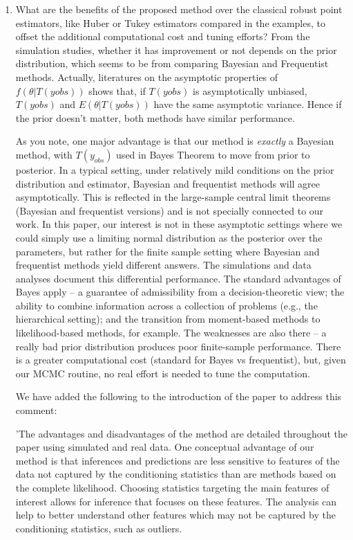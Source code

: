 \documentclass{article}
\newcommand{\response}[1]{{\color{blue}#1}}
\begin{document}
\begin{enumerate}
\item What are the benefits of the proposed method over the classical robust point estimators, like Huber or Tukey estimators compared in the examples, to offset the additional computational cost and tuning efforts? From the simulation studies, whether it has improvement or not depends on the prior distribution, which seems to be from comparing Bayesian and Frequentist methods. Actually, literatures on the asymptotic properties of $f(\theta|T(yobs))$ shows that, if $T(yobs)$ is asymptotically unbiased, $T (yobs)$ and $E(\theta | T (yobs))$ have the same asymptotic variance. Hence if the prior doesn't matter, both methods have similar performance.

\response{As you note, one major advantage is that our method is {\em exactly} a Bayesian method, with $T(y_{obs})$ used in Bayes Theorem to move from prior to posterior.  In a typical setting, under relatively mild conditions on the prior distribution and estimator, Bayesian and frequentist methods will agree asymptotically.  This is reflected in the large-sample central limit theorems (Bayesian and frequentist versions) and is not specially connected to our work.  In this paper, our interest is not in these asymptotic settings where we could simply use a limiting normal distribution as the posterior over the parameters, but rather for the finite sample setting where Bayesian and frequentist methods yield different answers.  The simulations and data analyses document this differential performance.  The standard advantages of Bayes apply -- a guarantee of admissibility from a decision-theoretic view; the ability to combine information across a collection of problems (e.g., the hierarchical setting); and the transition from moment-based methods to likelihood-based methods, for example.  The weaknesses are also there -- a really bad prior distribution produces poor finite-sample performance.  There is a greater computational cost (standard for Bayes vs frequentist), but, given our MCMC routine, no real effort is needed to tune the computation.}  

\response{We have added the following to the introduction of the paper to address this comment:}

\response{'The advantages and disadvantages of the method are detailed throughout the paper using simulated and real data. One conceptual advantage of our method is that inferences and predictions are less sensitive to features of the data not captured by
the conditioning statistics than are methods based on the complete likelihood. Choosing statistics targeting the main features of interest allows for inference that focuses on these features. The analysis can help to better understand other features which may not be captured by the conditioning statistics, such as outliers.} 


\end{enumerate}
\end{document}
